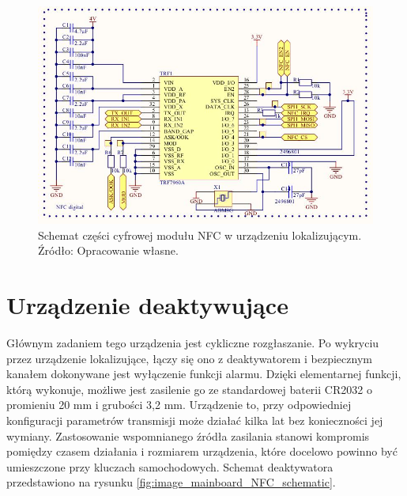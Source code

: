 \begin{figure}[H]
	\centering
	\includegraphics[width=15cm]{img/schematics/mainboard_NFC_chip.jpg}
	\caption{Schemat części cyfrowej modułu NFC w urządzeniu lokalizującym. \\ Źródło: Opracowanie własne.}
	\label{fig:image_mainboard_NFC_digital}
\end{figure}




\clearpage
\section{Urządzenie deaktywujące}

Głównym zadaniem tego urządzenia jest cykliczne rozgłaszanie. Po wykryciu przez urządzenie lokalizujące, łączy się ono z deaktywatorem i bezpiecznym kanałem dokonywane jest wyłączenie funkcji alarmu. Dzięki elementarnej funkcji, którą wykonuje, możliwe jest zasilenie go ze standardowej baterii CR2032 o promieniu 20 mm i grubości 3,2 mm. Urządzenie to, przy odpowiedniej konfiguracji parametrów transmisji może działać kilka lat bez konieczności jej wymiany. Zastosowanie wspomnianego źródła zasilania stanowi kompromis pomiędzy czasem działania i rozmiarem urządzenia, które docelowo powinno być umieszczone przy kluczach samochodowych. Schemat deaktywatora przedstawiono na rysunku \ref{fig:image_mainboard_NFC_schematic}.

